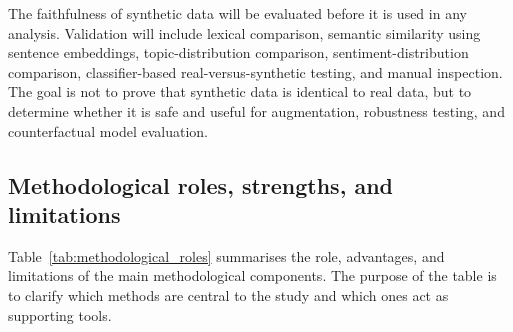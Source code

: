 \documentclass{article}
\begin{document}
The faithfulness of synthetic data will be evaluated before it is used in any
analysis. Validation will include lexical comparison, semantic similarity using
sentence embeddings, topic-distribution comparison, sentiment-distribution
comparison, classifier-based real-versus-synthetic testing, and manual
inspection. The goal is not to prove that synthetic data is identical to real
data, but to determine whether it is safe and useful for augmentation,
robustness testing, and counterfactual model evaluation.

\subsection{Methodological roles, strengths, and limitations}

Table~\ref{tab:methodological_roles} summarises the role, advantages, and
limitations of the main methodological components. The purpose of the table is
to clarify which methods are central to the study and which ones act as
supporting tools.
\end{document}
